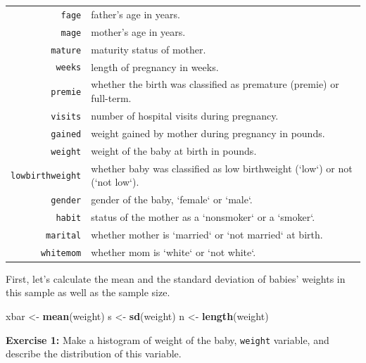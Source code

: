 \documentclass[
]{article}
\newenvironment{Shaded}{\begin{snugshade}}{\end{snugshade}}
\newcommand{\FunctionTok}[1]{\textcolor[rgb]{0.13,0.29,0.53}{\textbf{#1}}}
\newcommand{\NormalTok}[1]{#1}
\newcommand{\OtherTok}[1]{\textcolor[rgb]{0.56,0.35,0.01}{#1}}
\begin{document}
\begin{table}[h] \small
\begin{tabular}{r | l}
\texttt{fage} & father's age in years. \\
\texttt{mage} & mother's age in years. \\
\texttt{mature} & maturity status of mother. \\
\texttt{weeks} & length of pregnancy in weeks. \\
\texttt{premie} & whether the birth was classified as premature (premie) or full-term. \\
\texttt{visits} & number of hospital visits during pregnancy. \\
\texttt{gained} & weight gained by mother during pregnancy in pounds. \\
\texttt{weight} & weight of the baby at birth in pounds. \\
\texttt{lowbirthweight} & whether baby was classified as low birthweight (`low`) or not (`not low`). \\
\texttt{gender} & gender of the baby, `female` or `male`. \\
\texttt{habit} & status of the mother as a `nonsmoker` or a `smoker`. \\
\texttt{marital} & whether mother is `married` or `not married` at birth. \\
\texttt{whitemom} & whether mom is `white` or `not white`. \\
\end{tabular}
\end{table}

First, let's calculate the mean and the standard deviation of babies'
weights in this sample as well as the sample size.

\begin{Shaded}
\begin{Highlighting}[]
\NormalTok{xbar }\OtherTok{\textless{}{-}} \FunctionTok{mean}\NormalTok{(weight)}
\NormalTok{s }\OtherTok{\textless{}{-}} \FunctionTok{sd}\NormalTok{(weight)}
\NormalTok{n }\OtherTok{\textless{}{-}} \FunctionTok{length}\NormalTok{(weight)}
\end{Highlighting}
\end{Shaded}

\textbf{Exercise 1:} Make a histogram of weight of the baby,
\texttt{weight} variable, and describe the distribution of this
variable.
\end{document}
